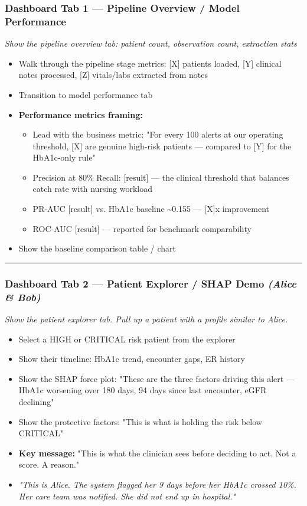 \documentclass[11pt,a4paper]{article}
\begin{document}
\subsubsection{Dashboard Tab 1 --- Pipeline Overview / Model Performance}
\emph{Show the pipeline overview tab: patient count, observation count, extraction stats}
\begin{itemize}
\item Walk through the pipeline stage metrics: [X] patients loaded, [Y] clinical notes processed, [Z] vitals/labs extracted from notes
\item Transition to model performance tab
\item \textbf{Performance metrics framing:}
\begin{itemize}
\item Lead with the business metric: "For every 100 alerts at our operating threshold, [X] are genuine high-risk patients --- compared to [Y] for the HbA1c-only rule"
\item Precision at 80\% Recall: [result] --- the clinical threshold that balances catch rate with nursing workload
\item PR-AUC [result] vs. HbA1c baseline \textasciitilde{}0.155 --- [X]x improvement
\item ROC-AUC [result] --- reported for benchmark comparability
\end{itemize}
\item Show the baseline comparison table / chart
\end{itemize}

\noindent\rule{\linewidth}{0.4pt}

\subsubsection{Dashboard Tab 2 --- Patient Explorer / SHAP Demo \emph{(Alice \& Bob)}}
\emph{Show the patient explorer tab. Pull up a patient with a profile similar to Alice.}
\begin{itemize}
\item Select a HIGH or CRITICAL risk patient from the explorer
\item Show their timeline: HbA1c trend, encounter gaps, ER history
\item Show the SHAP force plot: "These are the three factors driving this alert --- HbA1c worsening over 180 days, 94 days since last encounter, eGFR declining"
\item Show the protective factors: "This is what is holding the risk below CRITICAL"
\item \textbf{Key message:} "This is what the clinician sees before deciding to act. Not a score. A reason."
\item \emph{"This is Alice. The system flagged her 9 days before her HbA1c crossed 10\%. Her care team was notified. She did not end up in hospital."}
\end{itemize}
\end{document}
